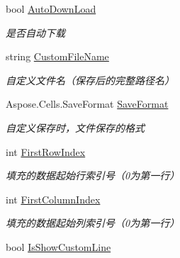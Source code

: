 \begin{DoxyCompactItemize}
bool \hyperlink{class_x_c_l_net_tools_1_1_entity_1_1_office_1_1_excel_handler_1_1_out_put_param_class_a31974296d52728900508e02b4ad040b8}{Auto\+Down\+Load}
\begin{DoxyCompactList}\small\item\em 是否自动下载 \end{DoxyCompactList}\item 
string \hyperlink{class_x_c_l_net_tools_1_1_entity_1_1_office_1_1_excel_handler_1_1_out_put_param_class_a764a7f2a435a3b3ab61c02ff7fc0d942}{Custom\+File\+Name}
\begin{DoxyCompactList}\small\item\em 自定义文件名（保存后的完整路径名） \end{DoxyCompactList}\item 
Aspose.\+Cells.\+Save\+Format \hyperlink{class_x_c_l_net_tools_1_1_entity_1_1_office_1_1_excel_handler_1_1_out_put_param_class_a9ceabce939de783bbe5ee3774183db8e}{Save\+Format}
\begin{DoxyCompactList}\small\item\em 自定义保存时，文件保存的格式 \end{DoxyCompactList}\item 
int \hyperlink{class_x_c_l_net_tools_1_1_entity_1_1_office_1_1_excel_handler_1_1_out_put_param_class_acd2e964c33b831d1cbd69e003ccd0311}{First\+Row\+Index}
\begin{DoxyCompactList}\small\item\em 填充的数据起始行索引号（0为第一行） \end{DoxyCompactList}\item 
int \hyperlink{class_x_c_l_net_tools_1_1_entity_1_1_office_1_1_excel_handler_1_1_out_put_param_class_aac59845922cfe83121fa7ffb39e8564b}{First\+Column\+Index}
\begin{DoxyCompactList}\small\item\em 填充的数据起始列索引号（0为第一行） \end{DoxyCompactList}\item 
bool \hyperlink{class_x_c_l_net_tools_1_1_entity_1_1_office_1_1_excel_handler_1_1_out_put_param_class_a6fca02e4b0654506b9bcc19b690a3ed8}{Is\+Show\+Custom\+Line}

\end{DoxyCompactItemize}
